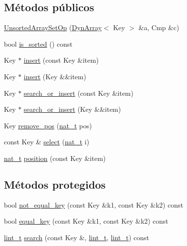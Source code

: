 \subsection*{Métodos públicos}
\begin{DoxyCompactItemize}
\item 
\hyperlink{class_designar_1_1_unsorted_array_set_op_a3f01d03aaf449273fd884809764cf841}{Unsorted\+Array\+Set\+Op} (\hyperlink{class_designar_1_1_dyn_array}{Dyn\+Array}$<$ Key $>$ \&a, Cmp \&c)
\item 
bool \hyperlink{class_designar_1_1_unsorted_array_set_op_afc0e1e303afc39e67727d985a0eb122e}{is\+\_\+sorted} () const
\item 
Key $\ast$ \hyperlink{class_designar_1_1_unsorted_array_set_op_a7e205053bbcef407bdbde7dae628b2a7}{insert} (const Key \&item)
\item 
Key $\ast$ \hyperlink{class_designar_1_1_unsorted_array_set_op_aaab3531e6bd3e3044560f3645ce2c529}{insert} (Key \&\&item)
\item 
Key $\ast$ \hyperlink{class_designar_1_1_unsorted_array_set_op_a620fa45eb4c7ec033569321ecdb2eace}{search\+\_\+or\+\_\+insert} (const Key \&item)
\item 
Key $\ast$ \hyperlink{class_designar_1_1_unsorted_array_set_op_afbef93edb33f4767a16f27affaefcee3}{search\+\_\+or\+\_\+insert} (Key \&\&item)
\item 
Key \hyperlink{class_designar_1_1_unsorted_array_set_op_aced2517a0e708effb820f5591369a7c1}{remove\+\_\+pos} (\hyperlink{namespace_designar_aa72662848b9f4815e7bf31a7cf3e33d1}{nat\+\_\+t} pos)
\item 
const Key \& \hyperlink{class_designar_1_1_unsorted_array_set_op_aa73bc195688fed065a7cdd6b3f06a02e}{select} (\hyperlink{namespace_designar_aa72662848b9f4815e7bf31a7cf3e33d1}{nat\+\_\+t} i)
\item 
\hyperlink{namespace_designar_aa72662848b9f4815e7bf31a7cf3e33d1}{nat\+\_\+t} \hyperlink{class_designar_1_1_unsorted_array_set_op_ab2f0ef08a3d92669f793727d51de705e}{position} (const Key \&item)
\end{DoxyCompactItemize}
\subsection*{Métodos protegidos}
\begin{DoxyCompactItemize}
\item 
bool \hyperlink{class_designar_1_1_unsorted_array_set_op_aed07acdf2c6e94cbe1392e78f9484c2a}{not\+\_\+equal\+\_\+key} (const Key \&k1, const Key \&k2) const
\item 
bool \hyperlink{class_designar_1_1_unsorted_array_set_op_adaba74cc7cc8541af17b7324b9ac3eb4}{equal\+\_\+key} (const Key \&k1, const Key \&k2) const
\item 
\hyperlink{namespace_designar_a9d113d66a39e82b73727c72cd3a52f73}{lint\+\_\+t} \hyperlink{class_designar_1_1_unsorted_array_set_op_ac53cf73a36b29889fecf4bf06196e561}{search} (const Key \&, \hyperlink{namespace_designar_a9d113d66a39e82b73727c72cd3a52f73}{lint\+\_\+t}, \hyperlink{namespace_designar_a9d113d66a39e82b73727c72cd3a52f73}{lint\+\_\+t}) const
\end{DoxyCompactItemize}


